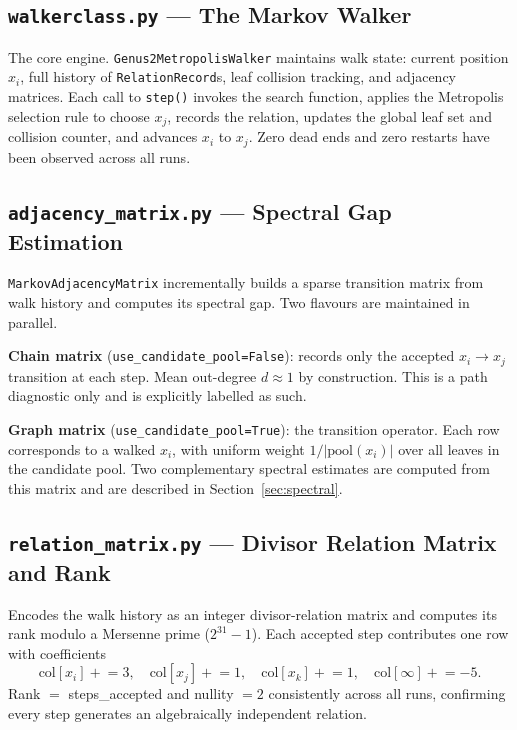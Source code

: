 \documentclass[11pt]{article}
\theoremstyle{definition}
\theoremstyle{remark}
\begin{document}
\subsection{\texttt{walkerclass.py} — The Markov Walker}

The core engine. \texttt{Genus2MetropolisWalker} maintains walk state: current
position $x_i$, full history of \texttt{RelationRecord}s, leaf collision
tracking, and adjacency matrices. Each call to \texttt{step()} invokes the
search function, applies the Metropolis selection rule to choose $x_j$, records
the relation, updates the global leaf set and collision counter, and advances
$x_i$ to $x_j$. Zero dead ends and zero restarts have been observed across all
runs.

\subsection{\texttt{adjacency\_matrix.py} — Spectral Gap Estimation}

\texttt{MarkovAdjacencyMatrix} incrementally builds a sparse transition matrix
from walk history and computes its spectral gap. Two flavours are maintained in
parallel.

\medskip
\noindent\textbf{Chain matrix} (\texttt{use\_candidate\_pool=False}): records
only the accepted $x_i \to x_j$ transition at each step. Mean out-degree
$d \approx 1$ by construction. This is a path diagnostic only and is explicitly
labelled as such.

\medskip
\noindent\textbf{Graph matrix} (\texttt{use\_candidate\_pool=True}): the
transition operator. Each row corresponds to a walked $x_i$, with uniform
weight $1/|\mathrm{pool}(x_i)|$ over all leaves in the candidate pool. Two
complementary spectral estimates are computed from this matrix and are described
in Section~\ref{sec:spectral}.

\subsection{\texttt{relation\_matrix.py} — Divisor Relation Matrix and Rank}

Encodes the walk history as an integer divisor-relation matrix and computes its
rank modulo a Mersenne prime ($2^{31}-1$). Each accepted step contributes one
row with coefficients
\[
  \mathrm{col}[x_i] \mathrel{+}= 3,\quad
  \mathrm{col}[x_j] \mathrel{+}= 1,\quad
  \mathrm{col}[x_k] \mathrel{+}= 1,\quad
  \mathrm{col}[\infty] \mathrel{+}= -5.
\]
Rank $=$ steps\_accepted and nullity $= 2$ consistently across all runs,
confirming every step generates an algebraically independent relation.
\end{document}
